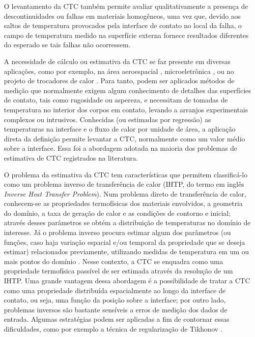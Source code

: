O levantamento da CTC também permite avaliar qualitativamente a presença de descontinuidades ou falhas
em materiais homogêneos, uma vez que, devido aos saltos de temperatura provocados pela interface de contato no local da falha,
o campo de temperatura medido na superfície externa fornece resultados diferentes do esperado se tais falhas não ocorressem.

A necessidade de cálculo ou estimativa da CTC se faz presente em diversas aplicações, como por exemplo, na área aeroespacial \citep{artigo_aerospacial}, microeletrônica
\citep{artigo_snaith}, ou no projeto de trocadores de calor \citep{artigo_huang}. Para tanto, podem ser aplicados métodos de medição que normalmente exigem
algum conhecimento de detalhes das superfícies de contato, tais como rugosidade ou aspereza, e necessitam de tomadas de temperatura no interior dos corpos em contato, levando a arranjos
experimentais complexos ou intrusivos. Conhecidas (ou estimadas por regressão) as temperaturas na interface e o fluxo de calor por unidade de área, a aplicação
direta da definição permite levantar a CTC, normalmente como um valor médio sobre a interface. Essa foi a abordagem adotada na maioria dos problemas de estimativa
de CTC registrados na literatura.

O problema da estimativa da CTC tem características que permitem classificá-lo como um problema inverso de transferência de calor (IHTP, do termo em inglês
\textit{Inverse Heat Transfer Problem}). Num problema direto de transferência de calor, conhecem-se as propriedades termofísicas dos materiais envolvidos, a geometria do domínio, 
a taxa de geração de calor e as
condições de contorno e inicial; através desses parâmetros se obtém a distribuição de temperaturas no domínio de interesse. Já o problema inverso procura
estimar algum dos parâmetros (ou funções, caso haja variação espacial e/ou temporal da propriedade que se deseja estimar) relacionados previamente, utilizando medidas de temperatura em um ou mais pontos do domínio \citep{livro_beck_2}.
Nesse contexto, a CTC se enquadra como uma propriedade termofísica passível de ser estimada através da resolução de um IHTP. Uma grande vantagem dessa
abordagem é a possibilidade de tratar a CTC como uma propriedade distribuída espacialmente ao longo da interface de contato, ou seja, uma função da posição sobre a interface; por outro lado, problemas
inversos são bastante sensíveis a erros de medição dos dados de entrada. Algumas estratégias podem ser aplicadas
a fim de contornar essas dificuldades, como por exemplo a técnica de regularização de Tikhonov \citep{livro_tikonov}.

